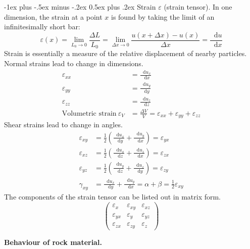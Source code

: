 \documentclass[10pt,landscape,a4paper]{article}
\makeatletter
\newcounter{Chapcounter}
\newcommand{\chapter}[1]{{\addtocounter{Chapcounter}{1}\fontsize{17}{16}\textbf{#1}}}
\renewcommand\d{\mathop{}\!\mathrm{d}}
\renewcommand{\section}{\@startsection{section}{1}{0mm}%
	{-1ex plus -.5ex minus -.2ex}%
	{0.5ex plus .2ex}%
	{\normalfont\large\bfseries}}
\makeatother
\begin{document}
\begin{multicols}{3}
	\section{Strain $ \varepsilon $ (strain tensor).}
	In one dimension, the strain at a point $x$ is found by taking the limit of an infinitesimally short bar:
	\[
		\varepsilon(x)=\lim_{L_0\to0}\frac{\Delta L}{L_0}=\lim_{\Delta x\to0}\frac{u(x+\Delta x)-u(x)}{\Delta x}=\frac{\d u}{\d x}
	\]
	Strain is essentially a measure of the relative displacement of nearby particles.\\
	Normal strains lead to change in dimensions.
	\begin{align*}
		\varepsilon_{xx}                         & =\frac{\d u_x}{\d x}                                                   \\
		\varepsilon_{yy}                         & =\frac{\d u_y}{\d y}                                                   \\
		\varepsilon_{zz}                         & =\frac{\d u_z}{\d z}                                                   \\
		\text{Volumetric strain} \ \varepsilon_V & =\frac{\Delta V}{V}=\varepsilon_{xx}+\varepsilon_{yy}+\varepsilon_{zz}
	\end{align*}
	Shear strains lead to change in angles.
	\begin{align*}
		\varepsilon_{xy} & =\frac{1}{2}\left(\frac{\d u_x}{\d y}+\frac{\d u_y}{\d x}\right)=\varepsilon_{yx} \\
		\varepsilon_{xz} & =\frac{1}{2}\left(\frac{\d u_x}{\d z}+\frac{\d u_z}{\d x}\right)=\varepsilon_{zx} \\
		\varepsilon_{yz} & =\frac{1}{2}\left(\frac{\d u_y}{\d z}+\frac{\d u_z}{\d y}\right)=\varepsilon_{zy} \\
		\gamma_{xy}      & =\frac{\d u_x}{\d y}+\frac{\d u_y}{\d x}=\alpha+\beta=\frac{1}{2}\varepsilon_{xy}
	\end{align*}
	The components of the strain tensor can be listed out in matrix form.
	\[
		\begin{pmatrix}
			\varepsilon_x    & \varepsilon_{xy} & \varepsilon_{xz} \\
			\varepsilon_{yx} & \varepsilon_y    & \varepsilon_{yz} \\
			\varepsilon_{zx} & \varepsilon_{zy} & \varepsilon_z
		\end{pmatrix}
	\]
	
	\chapter{Behaviour of rock material.}
	

\end{multicols}
\end{document}
